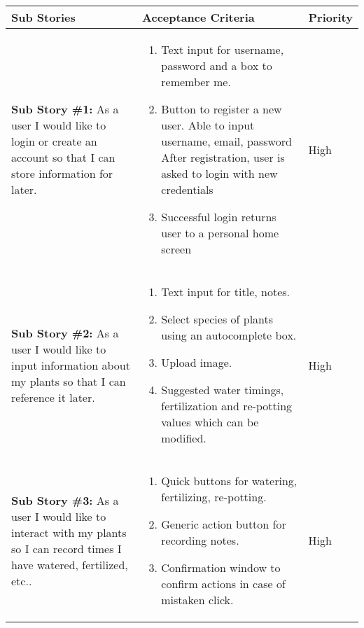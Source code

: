 \documentclass[portfolio.tex.tex]{subfiles}
\begin{document}
					\vspace{1cm}
					\hspace{-0.5cm}
					\begin{tabular}{p{6cm}|p{6cm}|p{4cm}}
						\large\textbf{Sub Stories} & \large \textbf{Acceptance Criteria} &\large \textbf{ Priority} \\
						\hline


						\textbf{Sub Story \#1:} As a user I would like to login or create an account so that I can store information for later.  &
						\vspace{-0.8cm}
						\begin{enumerate}
							\item  	Text input for username, password and a box to remember me.
							\item 	Button to register a new user.
								\subitem Able to input username, email, password
								\subitem After registration, user is asked to login with new credentials
							\item 	Successful login returns user to a personal home screen
						\end{enumerate}&

						\vspace{-1cm}\color{red}High\\

						\textbf{Sub Story \#2:} As a user I would like to  input information about my plants so that I can reference it later.  &
						\vspace{-0.8cm}
						\begin{enumerate}
							\item  	Text input for title, notes.
							\item 	Select species of plants using an autocomplete box.
							\item 	Upload image.
							\item 	Suggested water timings, fertilization and re-potting values which can be modified.
						\end{enumerate}&

						\vspace{-1cm}\color{red}High\\

						\textbf{Sub Story \#3:} As a user I would like to interact with my plants so I can record times I have watered, fertilized, etc..  &
						\vspace{-0.8cm}
						\begin{enumerate}
							\item  	Quick buttons for watering, fertilizing, re-potting.
							\item 	Generic action button for recording notes.
							\item 	Confirmation window to confirm actions in case of mistaken click.
						\end{enumerate}&

						\vspace{-1cm}\color{red}High\\
					\end{tabular}
\end{document}
